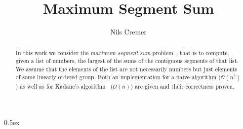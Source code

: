 \documentclass[11pt,a4paper]{article}
\begin{document}
\title{Maximum Segment Sum}
\author{Nils Cremer}
\maketitle

\begin{abstract}
In this work we consider the \emph{maximum segment sum} problem~\cite{wiki}, that is to compute, given a list of numbers,
the largest of the sums of the contiguous segments of that list.
We assume that the elements of the list are not necessarily numbers but just elements
of some linearly ordered group.
Both an implementation for a naive algorithm ($\mathcal{O}(n^2)$) as well as for Kadane's algorithm~\cite{wiki} ($\mathcal{O}(n)$) are given and their correctness proven.
\end{abstract}

\tableofcontents

\parindent 0pt\parskip 0.5ex





\end{document}
